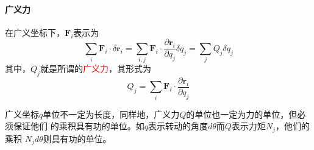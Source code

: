 \paragraph*{广义力}
在广义坐标下，$\bm{F}_i$表示为
\begin{equation}
	\sum_i \bm{F}_i \cdot \delta \bm{r}_i = \sum_{i, j}\bm{F}_i \cdot \frac{\partial \bm{r}_i}{\partial q_j} \delta q_j = \sum_{j} Q_j \delta q_j
\end{equation} 
其中，$Q_j$就是所谓的\textcolor{red}{广义力}，其形式为
\begin{equation}
	Q_j = \sum_{i} \bm{F}_i \cdot \frac{\partial \bm{r}_i}{\partial q_j}	\label{eq_generalized_force}
\end{equation} 
\begin{note}
	广义坐标$q$单位不一定为长度，同样地，广义力$Q$的单位也一定为力的单位，但必须保证他们
    的乘积具有功的单位。如$q$表示转动的角度$d\theta$而$Q$表示力矩$N_j$，他们的乘积
    $N_j d\theta$则具有功的单位。
\end{note}
